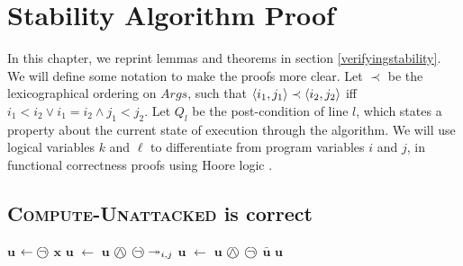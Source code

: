 \chapter{Stability Algorithm Proof}
\label{stabilityproof}

In this chapter, we reprint lemmas and theorems in section \ref{verifyingstability}. We will define some notation to make the proofs more clear. Let $\prec$ be the lexicographical ordering on $Args$, such that $\langle{i_1},{j_1}\rangle\prec\langle{i_2},{j_2}\rangle$ iff $i_1<i_2\lor i_1=i_2\land j_1<j_2$. Let $Q_l$ be the post-condition of line $l$, which states a property about the current state of execution through the algorithm. We will use logical variables $k$ and $\ell$ to differentiate from program variables $i$ and $j$, in functional correctness proofs using Hoore logic \cite{hoare}.

\section{\textsc{Compute-Unattacked} is correct}

\begin{algorithm}[H]
	\begin{algorithmic}[1]
			\State $\mathbf{u}$ $\gets\incircbin{\neg}$ $\mathbf{x}$
					\State $\mathbf{u}$ $\gets$ $\mathbf{u}$ $\incircbin{\land}$ $\incircbin{\neg}\twoheadrightarrow_{i,j}$
				\EndIf
			\EndFor
			\State $\mathbf{u}$ $\gets$ $\mathbf{u}$ $\incircbin{\land}$ $\incircbin{\neg}$ $\bar{\mathbf{u}}$
			\State \Return $\mathbf{u}$
		\EndFunction
	\end{algorithmic}
\end{algorithm}

